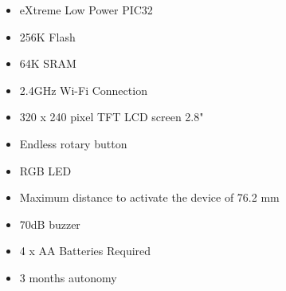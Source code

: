 \documentclass[12pt,a4paper,landscape]{article}
\begin{document}
	\vspace{6em}

	\begin{itemize}
		\item eXtreme Low Power PIC32
		\item 256K Flash
		\item 64K SRAM
		\item 2.4GHz Wi-Fi Connection
		\item 320 x 240 pixel TFT LCD screen 2.8"
		\item Endless rotary button
		\item RGB LED
		\item Maximum distance to activate the device of 76.2 mm
		\item 70dB buzzer
		\item 4 x AA Batteries Required
		\item 3 months autonomy
	\end{itemize}

\vspace{2cm}

\newpage
{}
\end{document}
